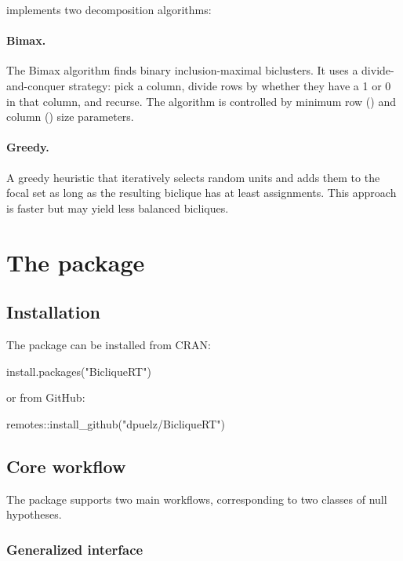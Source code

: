 \documentclass[article]{jss}
\begin{document}
 implements two decomposition algorithms:

\paragraph{Bimax.}  The Bimax algorithm \citep{prelic2006systematic} finds
binary inclusion-maximal biclusters.  It uses a divide-and-conquer
strategy: pick a column, divide rows by whether they have a 1 or 0 in
that column, and recurse.  The algorithm is controlled by minimum row
() and column () size parameters.

\paragraph{Greedy.}  A greedy heuristic that iteratively selects random
units and adds them to the focal set as long as the resulting biclique
has at least  assignments.  This approach is faster but may
yield less balanced bicliques.



\section[The BicliqueRT package]{The  package} \label{sec:package}

\subsection{Installation}

The package can be installed from CRAN:
\begin{Code}
install.packages("BicliqueRT")
\end{Code}
or from GitHub:
\begin{Code}
remotes::install_github("dpuelz/BicliqueRT")
\end{Code}

\subsection{Core workflow}

The  package supports two main workflows, corresponding
to two classes of null hypotheses.

\subsubsection{Generalized interface}
\end{document}
